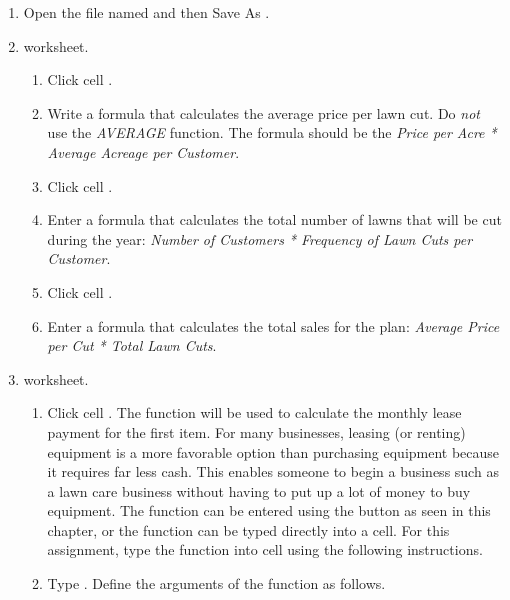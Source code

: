 \begin{enumbox}
	\begin{enumerate}
		\item Open the file named  and then Save As .
	
		\item {} worksheet.
	
		\begin{enumerate}
			\item Click cell .
		
			\item Write a formula that calculates the average price per lawn cut. Do \textit{not} use the \textit{AVERAGE} function. The formula should be the \textit{Price per Acre * Average Acreage per Customer}.
			
			\item Click cell .
			
			\item Enter a formula that calculates the total number of lawns that will be cut during the year: \textit{Number of Customers * Frequency of Lawn Cuts per Customer}.
			
			\item Click cell .
			
			\item Enter a formula that calculates the total sales for the plan: \textit{Average Price per Cut * Total Lawn Cuts}.
		\end{enumerate}
		
		\item {} worksheet.
		
		\begin{enumerate}
			\item Click cell . The  function will be used to calculate the monthly lease payment for the first item. For many businesses, leasing (or renting) equipment is a more favorable option than purchasing equipment because it requires far less cash. This enables someone to begin a business such as a lawn care business without having to put up a lot of money to buy equipment. The  function can be entered using the  button as seen in this chapter, or the  function can be typed directly into a cell. For this assignment, type the function into cell  using the following instructions.
			
			\item Type . Define the arguments of the function as follows.
		

\end{enumerate}
\end{enumerate}
\end{enumbox}
